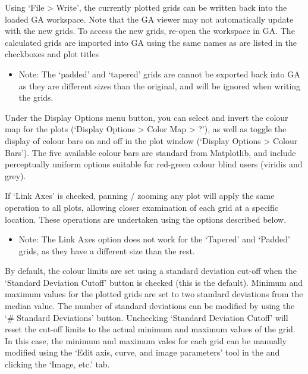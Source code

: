 \documentclass[letterpaper,10pt,english,openany,oneside]{sphinxmanual}
\begin{document}
Using ‘File \textendash{}\textgreater{} Write’, the currently plotted grids can be written back into the loaded GA workspace. Note that the GA viewer may not automatically update with the new grids. To access the new grids, re-open the workspace in GA.
The calculated grids are imported into GA using the same names as are listed in the checkboxes and plot titles
\begin{itemize}
\item {} 
Note: The ‘padded’ and ‘tapered’ grids are cannot be exported back into GA as they are different sizes than the original, and will be ignored when writing the grids.

\end{itemize}

Under the Display Options menu button, you can select and invert the colour map for the plots (‘Display Options \textendash{}\textgreater{} Color Map \textendash{}\textgreater{} ?’), as well as toggle the display of colour bars on and off in the plot window (‘Display Options \textendash{}\textgreater{} Colour Bars’). The five available colour bars are standard from Matplotlib, and include perceptually uniform options suitable for red-green colour blind users (viridis and grey).

If ‘Link Axes’ is checked, panning / zooming any plot will apply the same operation to all plots, allowing closer examination of each grid at a specific location. These operations are undertaken using the {\hyperref[\detokenize{content/getting_started/GUI_overview:toolbar}]{}} options described below.
\begin{itemize}
\item {} 
Note: The Link Axes option does not work for the ‘Tapered’ and ‘Padded’ grids, as they have a different size than the rest.

\end{itemize}

By default, the colour limits are set using a standard deviation cut-off when the ‘Standard Deviation Cutoff’ button is checked (this is the default). Minimum and maximum values for the plotted grids are set to two standard deviations from the median value. The number of standard deviations can be modified by using the ‘\# Standard Deviations’ button. Unchecking ‘Standard Deviation Cutoff’ will reset the cut-off limits to the actual minimum and maximum values of the grid. In this case, the minimum and maximum vales for each grid can be manually modified using the ‘Edit axis, curve, and image parameters’ tool in the {\hyperref[\detokenize{content/getting_started/GUI_overview:toolbar}]{}} and clicking the ‘Image, etc.’ tab.
\end{document}
